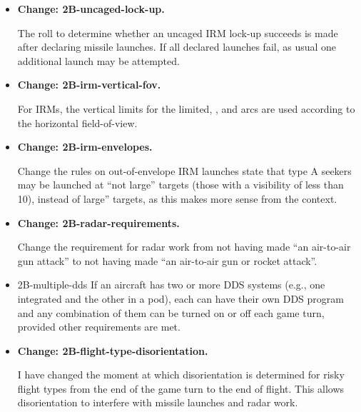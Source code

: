 \documentclass[10pt]{report}
\newcommand{\itemtag}[1]{\item \textbf{Change: #1.}\par}
\begin{document}
\begin{itemize}
    \itemtag{2B-uncaged-lock-up} The roll to determine whether an uncaged IRM lock-up succeeds is made after declaring missile launches. If all declared launches fail, as usual one additional launch may be attempted.

    \itemtag{2B-irm-vertical-fov} For IRMs, the vertical limits for the limited, , and  arcs are used according to the horizontal field-of-view.

    \itemtag{2B-irm-envelopes} Change the rules on out-of-envelope IRM launches state that type A seekers may be launched at “not large” targets (those with a visibility of less than 10), instead of large” targets, as this makes more sense from the context.

    \itemtag{2B-radar-requirements} Change the requirement for radar work from not having made “an air-to-air gun attack” to not having made “an air-to-air gun or rocket attack”.
    


    
    \item{2B-multiple-dds} If an aircraft has two or more DDS systems (e.g., one integrated and the other in a pod), each can have their own DDS program and any combination of them can be turned on or off each game turn, provided other requirements are met.

    \itemtag{2B-flight-type-disorientation} I have changed the moment at which disorientation is determined for risky flight types from the end of the game turn to the end of flight. This allows disorientation to interfere with missile launches and radar work.
    

\end{itemize}
\end{document}
